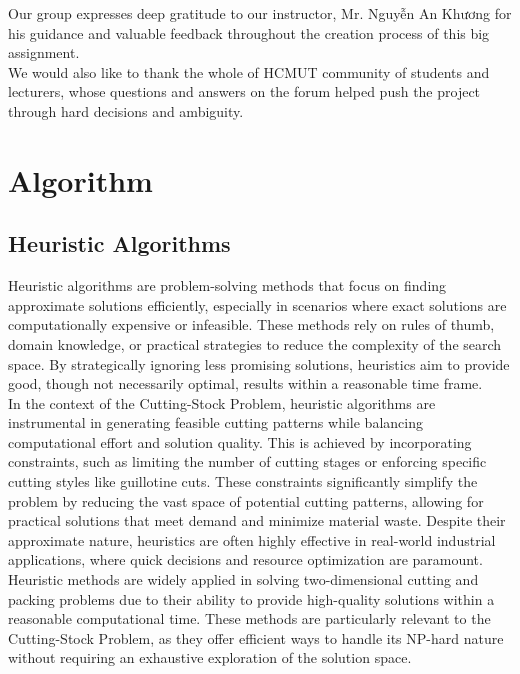 \documentclass[a4paper]{article}
\begin{document}
    Our group expresses deep gratitude to our instructor, Mr. Nguyễn An Khương for his guidance and valuable feedback throughout the creation process of this big assignment. 
    \vspace{0.2cm}\\
    We would also like to thank the whole of HCMUT community of students and lecturers, whose questions and answers on the forum helped push the project through hard decisions and ambiguity.

    \pagebreak
    \section{Algorithm}
    \subsection{Heuristic Algorithms}
    Heuristic algorithms are problem-solving methods that focus on finding approximate solutions efficiently, especially in scenarios where exact solutions are computationally expensive or infeasible. These methods rely on rules of thumb, domain knowledge, or practical strategies to reduce the complexity of the search space. By strategically ignoring less promising solutions, heuristics aim to provide good, though not necessarily optimal, results within a reasonable time frame.
    \vspace{0.2cm}\\
    In the context of the Cutting-Stock Problem, heuristic algorithms are instrumental in generating feasible cutting patterns while balancing computational effort and solution quality. This is achieved by incorporating constraints, such as limiting the number of cutting stages or enforcing specific cutting styles like guillotine cuts. These constraints significantly simplify the problem by reducing the vast space of potential cutting patterns, allowing for practical solutions that meet demand and minimize material waste. Despite their approximate nature, heuristics are often highly effective in real-world industrial applications, where quick decisions and resource optimization are paramount.
    \vspace{0.2cm}\\
    Heuristic methods are widely applied in solving two-dimensional cutting and packing problems due to their ability to provide high-quality solutions within a reasonable computational time. These methods are particularly relevant to the Cutting-Stock Problem, as they offer efficient ways to handle its NP-hard nature without requiring an exhaustive exploration of the solution space.
\end{document}
